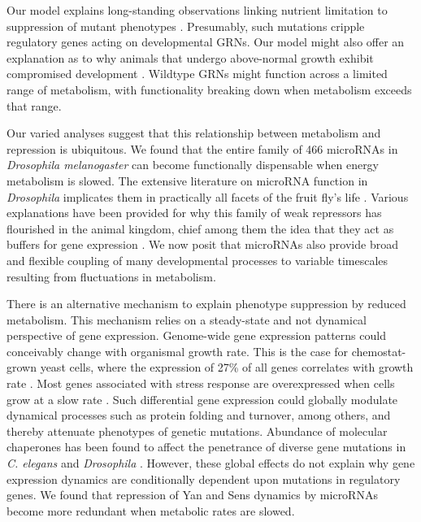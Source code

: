 Our model explains long-standing observations linking nutrient limitation to suppression of mutant phenotypes \cite{Morgan1915,Morgan1929}. Presumably, such mutations cripple regulatory genes acting on developmental GRNs. Our model might also offer an explanation as to why animals that undergo above-normal growth exhibit compromised development \cite{Arendt1997,Metcalfe2001}. Wildtype GRNs might function across a limited range of metabolism, with functionality breaking down when metabolism exceeds that range.

Our varied analyses suggest that this relationship between metabolism and repression is ubiquitous. We found that the entire family of 466 microRNAs in \textit{Drosophila melanogaster} can become functionally dispensable when energy metabolism is slowed. The extensive literature on microRNA function in \textit{Drosophila} implicates them in practically all facets of the fruit fly's life \cite{Bushati2007,Carthew2017}. Various explanations have been provided for why this family of weak repressors has flourished in the animal kingdom, chief among them the idea that they act as buffers for gene expression \cite{Ebert2012}. We now posit that microRNAs also provide broad and flexible coupling of many developmental processes to variable timescales resulting from fluctuations in metabolism.

There is an alternative mechanism to explain phenotype suppression by reduced metabolism. This mechanism relies on a steady-state and not dynamical perspective of gene expression. Genome-wide gene expression patterns could conceivably change with organismal growth rate. This is the case for chemostat-grown yeast cells, where the expression of 27\% of all genes correlates with growth rate \cite{Brauer2008}. Most genes associated with stress response are overexpressed when cells grow at a slow rate \cite{Brauer2008,Lu2009}. Such differential gene expression could globally modulate dynamical processes such as protein folding and turnover, among others, and thereby attenuate phenotypes of genetic mutations. Abundance of molecular chaperones has been found to affect the penetrance of diverse gene mutations in \textit{C. elegans} and \textit{Drosophila} \cite{Casanueva2012,Rutherford1998}. However, these global effects do not explain why gene expression dynamics are conditionally dependent upon mutations in regulatory genes. We found that repression of Yan and Sens dynamics by microRNAs become more redundant when metabolic rates are slowed.

